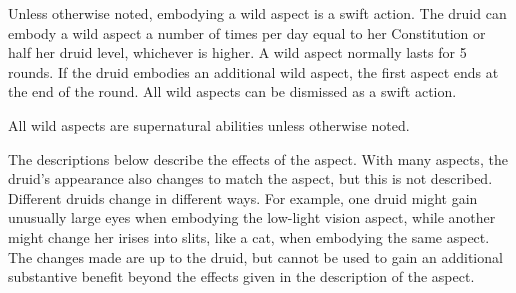 Unless otherwise noted, embodying a wild aspect is a swift action.
The druid can embody a wild aspect a number of times per day equal to her Constitution or half her druid level, whichever is higher.
A wild aspect normally lasts for 5 rounds.
If the druid embodies an additional wild aspect, the first aspect ends at the end of the round.
All wild aspects can be dismissed as a swift action.

All wild aspects are supernatural abilities unless otherwise noted.

The descriptions below describe the effects of the aspect.
With many aspects, the druid's appearance also changes to match the aspect, but this is not described.
Different druids change in different ways.
For example, one druid might gain unusually large eyes when embodying the low-light vision aspect, while another might change her irises into slits, like a cat, when embodying the same aspect.
The changes made are up to the druid, but cannot be used to gain an additional substantive benefit beyond the effects given in the description of the aspect.

